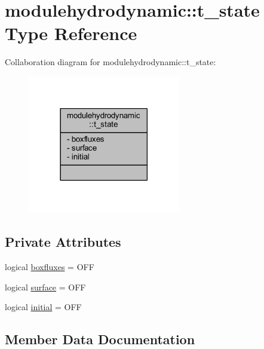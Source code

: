 \hypertarget{structmodulehydrodynamic_1_1t__state}{}\section{modulehydrodynamic\+:\+:t\+\_\+state Type Reference}
\label{structmodulehydrodynamic_1_1t__state}


Collaboration diagram for modulehydrodynamic\+:\+:t\+\_\+state\+:\nopagebreak
\begin{figure}[H]
\begin{center}
\leavevmode
\includegraphics[width=189pt]{structmodulehydrodynamic_1_1t__state__coll__graph}
\end{center}
\end{figure}
\subsection*{Private Attributes}
\begin{DoxyCompactItemize}
\item 
logical \mbox{\hyperlink{structmodulehydrodynamic_1_1t__state_a2f085c814a0e2cb176029b9a80786b32}{boxfluxes}} = O\+FF
\item 
logical \mbox{\hyperlink{structmodulehydrodynamic_1_1t__state_a8131a4e982571cf7ccacc2f3e9f71b97}{surface}} = O\+FF
\item 
logical \mbox{\hyperlink{structmodulehydrodynamic_1_1t__state_a95d572e439f1a4b6fedd502ea97c881d}{initial}} = O\+FF
\end{DoxyCompactItemize}


\subsection{Member Data Documentation}
\mbox{\label{structmodulehydrodynamic_1_1t__state_a2f085c814a0e2cb176029b9a80786b32}} 

